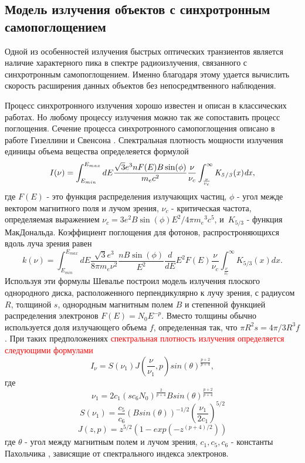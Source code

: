\subsection{Модель излучения объектов с синхротронным самопоглощением}

Одной из особенностей излучения быстрых оптических транзиентов является наличие характерного пика в спектре радиоизлучения, связанного с синхротронным самопоглощением. Именно благодаря этому удается вычислить скорость расширения данных объектов без непосредмтвенного наблюдения.

Процесс синхротронного излучения хорошо известен и описан в классических работах. Но  любому процессу излучения можно так же сопоставить процесс поглощения. Сечение процесса синхротронного самопоглощения описано в работе Гизеллини и Свенсона \cite{Ghisellini1991}. Спектральная плотность мощности излучения единицы объема вещества определеяется формулой
\begin{equation} \label{emission}
I(\nu)=\int_{E_{min}}^{E_{max}} dE \frac {\sqrt {3}{e}^{3}n F(E) B \sin ( \phi)}{{m_e}{c}^{2}}
\frac{\nu}{\nu_c}\int_{\frac {\nu}{\nu_c}}^{\infty }\it K_{5/3}(x)dx,
\end{equation}
где $F\left(E\right)$ - это функция распределения излучающих частиц, $\phi$ - угол межде вектором магнитного поля и лучом зрения, $\displaystyle\nu_{c}$  - критическая частота, определяемая выражением $\displaystyle\nu_{c} = 3 e^{2} B \sin(\phi) E^{2}/4\pi {m_{e}}^{3} c^{5}$, и~$K_{5/3}$ - функция МакДональда.
Коэффициент поглощения для фотонов, распростроняющихся вдоль луча зрения равен
\begin{equation}\label{absorption}
k(\nu)=\int_{E_{min}}^{E_{max}}dE\frac {\sqrt {3}{e}^{3}}{8\pi m_e \nu^2}\frac{n B\sin(\phi)}{E^2}
\frac{d}{dE} E^2 F(E)\frac {\nu}{ \nu_c}\int_{\frac {\nu}{ \nu_c}}^{\infty }K_{5/3}(x) dx.
\end{equation}
Используя эти формулы Шевалье \cite{Chevalier1998} построил модель излучения плоского однородного диска, расположенного перпендикулярно к лучу зрения, с радиусом $R$, толщиной $s$, однородным магнитным полем $B$ и степенной функцией распределения электронов $F(E) = N_0 E^{-p}$. Вместо толщины обычно используется доля излучающего объема $f$, определенная так, что $\pi R^2 s = 4 \pi /3 R^3 f$. При таких предположениях \textcolor{red}{спектральная плотность излучения определяется следующими формулами}
\begin{equation}
I_{\nu}=S(\nu_1)J(\frac{\nu}{\nu_1},p)
{sin(\theta)}^{\frac{p+2}{p+4}},
\end{equation}
где
\begin{equation}
\nu_1 = 2 c_1 {(s c_6 N_0)}^{\frac{2}{p+4}}{B sin(\theta)}^{\frac{p+2}{p+4}}
\end{equation}
\begin{equation}
S(\nu_1)=\frac{c_5}{c_6}{(B sin(\theta))}^{-1/2}{(\frac{\nu_1}{2 c_1})}^{5/2}
\end{equation}
\begin{equation}
J(z,p)=z^{5/2}(1-exp(-z^{(p+4)/2}))
\end{equation}
где $\theta$ - угол между магнитным полем и лучом зрения, $c_1, c_5, c_6$ - константы Пахольчика \cite{Pacholczyk}, зависящие от спектрального индекса электронов.


